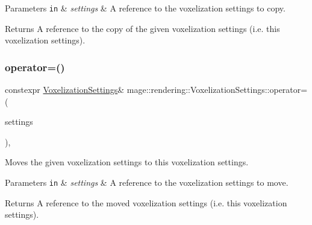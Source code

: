 \begin{DoxyParams}[1]{Parameters}
\mbox{\tt in}  & {\em settings} & A reference to the voxelization settings to copy. \\
\hline
\end{DoxyParams}
\begin{DoxyReturn}{Returns}
A reference to the copy of the given voxelization settings (i.\+e. this voxelization settings). 
\end{DoxyReturn}
\mbox{\label{classmage_1_1rendering_1_1_voxelization_settings_a96ea5fa3e2a8bdab0b4835caa11bd13f}} 
\subsubsection{\texorpdfstring{operator=()}{operator=()}\hspace{0.1cm}{\footnotesize\ttfamily [2/2]}}
{\footnotesize\ttfamily constexpr \mbox{\hyperlink{classmage_1_1rendering_1_1_voxelization_settings}{Voxelization\+Settings}}\& mage\+::rendering\+::\+Voxelization\+Settings\+::operator= (\begin{DoxyParamCaption}\item[{\mbox{\hyperlink{classmage_1_1rendering_1_1_voxelization_settings}{Voxelization\+Settings}} \&\&}]{settings }\end{DoxyParamCaption})\hspace{0.3cm}{\ttfamily [default]}, {\ttfamily [noexcept]}}

Moves the given voxelization settings to this voxelization settings.


\begin{DoxyParams}[1]{Parameters}
\mbox{\tt in}  & {\em settings} & A reference to the voxelization settings to move. \\
\hline
\end{DoxyParams}
\begin{DoxyReturn}{Returns}
A reference to the moved voxelization settings (i.\+e. this voxelization settings). 
\end{DoxyReturn}
\mbox{\label{classmage_1_1rendering_1_1_voxelization_settings_a626f15dab0fa74a7b4e0435b64f0c024}} 
